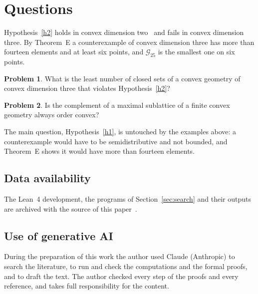 \documentclass[11pt]{amsart}
\theoremstyle{definition}
\newtheorem{problem}{Problem}
\theoremstyle{remark}
\numberwithin{equation}{section}
\begin{document}
\section{Questions}

Hypothesis~\ref{h2} holds in convex dimension two~\cite{AMSZ} and fails in convex dimension three. By Theorem~E a counterexample of convex dimension three has more than fourteen elements and at least six points, and $\mathcal G_{25}$ is the smallest one on six points.

\begin{problem}
What is the least number of closed sets of a convex geometry of convex dimension three that violates Hypothesis~\ref{h2}?
\end{problem}

\begin{problem}
Is the complement of a maximal sublattice of a finite convex geometry always order convex?
\end{problem}

The main question, Hypothesis~\ref{h1}, is untouched by the examples above: a counterexample would have to be semidistributive and not bounded, and Theorem~E shows it would have more than fourteen elements.

\subsection*{Data availability}
The Lean~4 development, the programs of Section~\ref{sec:search} and their outputs are archived with the source of this paper~\cite{Ar}.

\subsection*{Use of generative AI}
During the preparation of this work the author used Claude (Anthropic) to search the literature, to run and check the computations and the formal proofs, and to draft the text. The author checked every step of the proofs and every reference, and takes full responsibility for the content.
\end{document}
